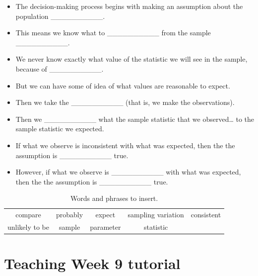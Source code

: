 \documentclass[
  11pt,
  a4paper,
  krantz2]{krantz}
\makeatletter
\providecommand{\tightlist}{%
  \setlength{\itemsep}{0pt}\setlength{\parskip}{0pt}}
\renewenvironment{quote}%
{\begin{kframe}}
{\end{kframe}}
\newenvironment{kframe}{%
\medskip{}
\setlength{\fboxsep}{.8em}
 \def\at@end@of@kframe{}%
 \ifinner\ifhmode%
  \def\at@end@of@kframe{\end{minipage}}%
  \begin{minipage}{\columnwidth}%
 \fi\fi%
 \def\FrameCommand##1{\hskip\@totalleftmargin \hskip-\fboxsep
 \colorbox{shadecolor}{##1}\hskip-\fboxsep
     \hskip-\linewidth \hskip-\@totalleftmargin \hskip\columnwidth}%
 \MakeFramed {\advance\hsize-\width
   \@totalleftmargin\z@ \linewidth\hsize
   \@setminipage}}%
 {\par\unskip\endMakeFramed%
 \at@end@of@kframe}
\renewenvironment{quote}
               {\list{}{\vspace{-0.5em}\begin{kframe}\small%
                        \rightmargin   \leftmargin
                        \parsep        \z@ \@plus\p@}%
                \item\relax}
               {\end{kframe}\endlist}
\makeatother
\begin{document}
\begin{quote}
\begin{itemize}
\tightlist
\item
  The decision-making process begins with making an assumption about the population \_\_\_\_\_\_\_\_\_\_.\\
\item
  This means we know what to \_\_\_\_\_\_\_\_\_\_ from the sample \_\_\_\_\_\_\_\_\_\_.\\
\item
  We never know exactly what value of the statistic we will see in the sample, because of \_\_\_\_\_\_\_\_\_\_.\\
\item
  But we can have some of idea of what values are reasonable to expect.\\
\item
  Then we take the \_\_\_\_\_\_\_\_\_\_ (that is, we make the observations).\\
\item
  Then we \_\_\_\_\_\_\_\_\_\_ what the sample statistic that we observed\ldots{} to the sample statistic we expected.\\
\item
  If what we observe is inconsistent with what was expected, then the the assumption is \_\_\_\_\_\_\_\_\_\_ true.\\
\item
  However, if what we observe is \_\_\_\_\_\_\_\_\_\_ with what was expected, then the the assumption is \_\_\_\_\_\_\_\_\_\_ true.
\end{itemize}
\end{quote}

\begin{table}
\centering
\caption{\label{tab:Words1Table}Words and phrases to insert.}
\centering
\fontsize{10}{12}\selectfont
\begin{tabular}[t]{ccccc}
\toprule
compare & probably & expect & sampling variation & consistent\\
unlikely to be & sample & parameter & statistic & \\
\bottomrule
\end{tabular}
\end{table}

\chapter{Teaching Week 9 tutorial}\label{Lecture9}
\end{document}
